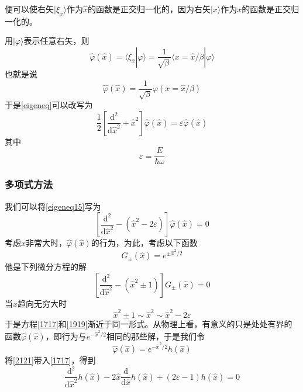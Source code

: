 \documentclass[]{article}
\begin{document}
便可以使右矢$|\xi_{\widehat{x}}\rangle$作为$\widehat{x}$的函数是正交归一化的，因为右矢$|x\rangle$作为$x$的函数是正交归一化的。\par 
用$|\varphi\rangle$表示任意右矢，则
\begin{equation}
	\widehat{\varphi}(\widehat{x})=\langle\xi_{\widehat{x}}|\varphi\rangle=\dfrac{1}{\sqrt{\beta}}\langle x=\widehat{x}/\beta|\varphi\rangle
\end{equation}
也就是说
\begin{equation}
	\widehat{\varphi}(\widehat{x})=\dfrac{1}{\sqrt{\beta}}\varphi(x=\widehat{x}/\beta)
	\label{1212}
\end{equation}
于是\eqref{eigeneq}可以改写为
\begin{equation}
	\dfrac{1}{2}\left[ \dfrac{\mathrm{d}^2}{\mathrm{d}\widehat{x}^2}+\widehat{x}^2\right] \widehat{\varphi}(\widehat{x})=\varepsilon\widehat{\varphi}(\widehat{x})
	\label{eigeneq15}
\end{equation}
其中
\begin{equation}
	\varepsilon=\dfrac{E}{\hbar\omega}
	\label{1616}
\end{equation}
\subsubsection{多项式方法}
我们可以将\eqref{eigeneq15}写为
\begin{equation}
	\left[ \dfrac{\mathrm{d}^2}{\mathrm{d}\widehat{x}^2}-(\widehat{x}^2-2\varepsilon)\right] \widehat{\varphi}(\widehat{x})=0
	\label{1717}
\end{equation}
考虑$\widehat{x}$非常大时，$\widehat{\varphi}(\widehat{x})$的行为，为此，考虑以下函数
\begin{equation}
	G_\pm(\widehat{x})=e^{\pm\widehat{x}^2/2}
\end{equation}
他是下列微分方程的解
\begin{equation}
	\left[ \dfrac{\mathrm{d}^2}{\mathrm{d}\widehat{x}^2}-(\widehat{x}^2\pm 1)\right] G_\pm(\widehat{x})=0
	\label{1919}
\end{equation}
当$\widehat{x}$趋向无穷大时
\begin{equation}
	\widehat{x}^2\pm 1\sim\widehat{x}^2\sim\widehat{x}^2-2\varepsilon
\end{equation}
于是方程\eqref{1717}和\eqref{1919}渐近于同一形式。从物理上看，有意义的只是处处有界的函数$\widehat{\varphi}(\widehat{x})$，即行为与$e^{-\widehat{x}^2/2}$相同的那些解，于是我们令
\begin{equation}
	\widehat{\varphi}(\widehat{x})=e^{-\widehat{x}^2/2}h(\widehat{x})
	\label{2121}
\end{equation}
将\eqref{2121}带入\eqref{1717}，得到
\begin{equation}
	\dfrac{\mathrm{d}^2}{\mathrm{d}\widehat{x}^2}h(\widehat{x})-2\widehat{x}\dfrac{\mathrm{d}}{\mathrm{d}\widehat{x}}h(\widehat{x})+(2\varepsilon-1)h(\widehat{x})=0
	\label{2222}
\end{equation}
\end{document}

